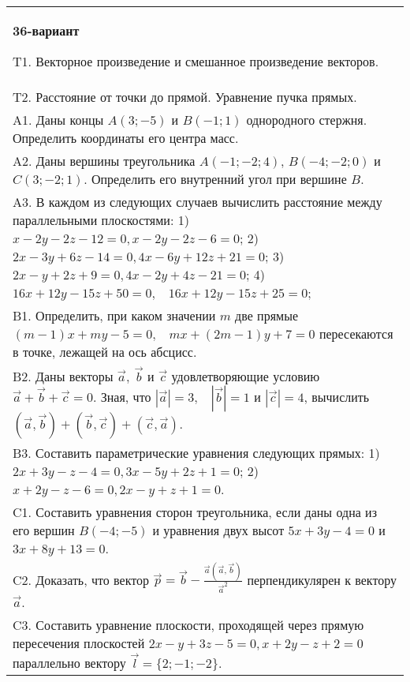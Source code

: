 \documentclass{article}
\begin{document}
\begin{tabular}{m{17cm}}
\textbf{36-вариант}
\newline

T1. 
Векторное произведение и смешанное произведение векторов.
 \\
T2. 
Расстояние от точки до прямой. Уравнение пучка прямых.
 \\
A1. Даны концы \(A(3; - 5)\) и \(B( - 1;1)\) однородного стержня. Определить координаты его центра масс.
 \\
A2. 
Даны вершины треугольника \(A( - 1; - 2;4)\), \(B( - 4; - 2;0)\) и \(C(3; - 2;1)\). Определить его внутренний угол при вершине \(B\).
 \\
A3. 
В каждом из следующих случаев вычислить расстояние между параллельными плоскостями: 1) \(x - 2y - 2z - 12 = 0,x - 2y - 2z - 6 = 0\); 2) \(2x - 3y + 6z - 14 = 0,4x - 6y + 12z + 21 = 0\); 3) \(2x - y + 2z + 9 = 0,4x - 2y + 4z - 21 = 0\); 4) \(16x + 12y - 15z + 50 = 0,\ \ \ \ 16x + 12y - 15z + 25 = 0\);
 \\
B1. 
Определить, при каком значении \(m\) две прямые \((m - 1)x + my - 5 = 0,\ \ \ \ mx + (2m - 1)y + 7 = 0\) пересекаются в точке, лежащей на ось абсцисс.
 \\
B2. 
Даны векторы \(\overrightarrow{a},\ \overrightarrow{b}\) и \(\overrightarrow{c}\) удовлетворяющие условию \(\overrightarrow{a} + \overrightarrow{b} + \overrightarrow{c} = 0\). Зная, что \(|\overrightarrow{a}| = 3,\ \ \ \ |\overrightarrow{b}| = 1\) и \(|\overrightarrow{c}| = 4\), вычислить \(\left( \overrightarrow{a},\overrightarrow{b} \right) + \left( \overrightarrow{b},\overrightarrow{c} \right) + \left( \overrightarrow{c},\overrightarrow{a} \right)\).
 \\
B3. 
Составить параметрические уравнения следующих прямых: 1) \(2x + 3y - z - 4 = 0,3x - 5y + 2z + 1 = 0\); 2) \(x + 2y - z - 6 = 0,2x - y + z + 1 = 0\).
 \\
C1. 
Составить уравнения сторон треугольника, если даны одна из его вершин \(B( - 4; - 5)\) и уравнения двух высот \(5x + 3y - 4 = 0\) и \(3x + 8y + 13 = 0\).
 \\
C2. 
Доказать, что вектор \(\overrightarrow{p} = \overrightarrow{b} - \frac{\overrightarrow{a}(\overrightarrow{a},\overrightarrow{b})}{{\overrightarrow{a}}^{2}}\) перпендикулярен к вектору \(\overrightarrow{a}\).
 \\
C3. Составить уравнение плоскости, проходящей через прямую пересечения плоскостей \(2x - y + 3z - 5 = 0,x + 2y - z + 2 = 0\) параллельно вектору \(\overrightarrow{l} = \{ 2; - 1; - 2\}\).
 \\

\end{tabular}
\vspace{1cm}
\end{document}
